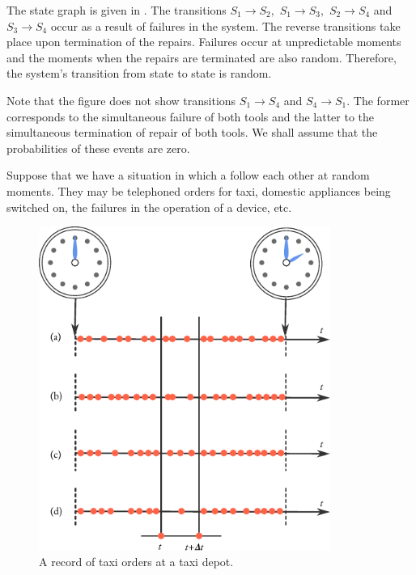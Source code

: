 The state graph is given in . The transitions
$S_{1} \to S_{2}, \,\, S_{1} \to S_{3}, \,\, S_{2} \to S_{4}$ and
$S_{3} \to S_{4}$ occur as a result of failures in the system. The
reverse transitions take place upon termination of the
repairs. Failures occur at unpredictable moments and the moments when
the repairs are terminated are also random. Therefore, the system's
transition from state to state is random.



 Note that the figure does not show transitions $S_{1} \to S_{4}$ and
 $S_{4} \to S_{1}$.  The former corresponds to the simultaneous
 failure of both tools and the latter to the simultaneous termination
 of repair of both tools. We shall assume that the probabilities of
 these events are zero.

  Suppose that we have a situation in which a
  follow each other at random moments. They
 may be telephoned orders for taxi, domestic appliances being switched
 on, the failures in the operation of a device, etc.

 \begin{figure}[!ht]
 \centering
 \includegraphics[width=0.85\textwidth]{figures/event-arrival.pdf}
\caption{A record of taxi orders at a taxi depot.\label{event-arrival}}
 \end{figure}


